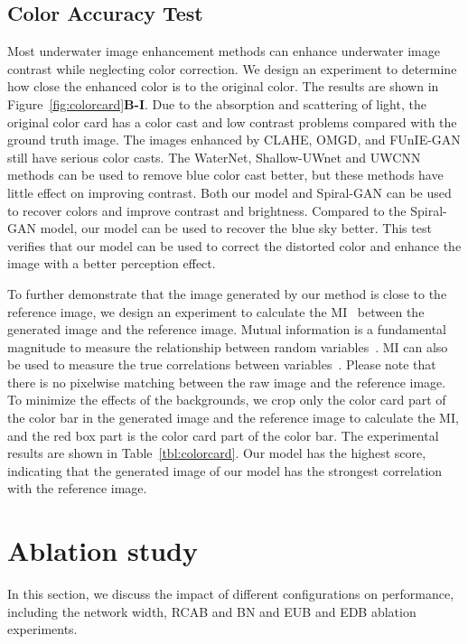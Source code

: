\documentclass[utf8]{FrontiersinHarvard} %
\begin{document}
\subsection{Color Accuracy Test}
Most underwater image enhancement methods can enhance underwater image contrast while neglecting color correction. We design an experiment to determine how close the enhanced color is to the original color. The results are shown in Figure~\ref{fig:colorcard}\textbf{B-I}. Due to the absorption and scattering of light, the original color card has a color cast and low contrast problems compared with the ground truth image. The images enhanced by CLAHE, OMGD, and FUnIE-GAN still have serious color casts. The WaterNet, Shallow-UWnet and UWCNN methods can be used to remove blue color cast better, but these methods have little effect on improving contrast. Both our model and Spiral-GAN can be used to recover colors and improve contrast and brightness. Compared to the Spiral-GAN model, our model can be used to recover the blue sky better. This test verifies that our model can be used to correct the distorted color and enhance the image with a better perception effect.

To further demonstrate that the image generated by our method is close to the reference image, we design an experiment to calculate the MI~\citep{kraskov2004estimating} between the generated image and the reference image. Mutual information is a fundamental magnitude to measure the relationship between random variables~\citep{2018Mutual}. MI can also be used to measure the true correlations between variables~\citep{Kinney2014Equitability}. Please note that there is no pixelwise matching between the raw image and the reference image. To minimize the effects of the backgrounds, we crop only the color card part of the color bar in the generated image and the reference image to calculate the MI, and the red box part is the color card part of the color bar. The experimental results are shown in Table~\ref{tbl:colorcard}. Our model has the highest score, indicating that the generated image of our model has the strongest correlation with the reference image.

\section{Ablation study}
In this section, we discuss the impact of different configurations on performance, including the network width, RCAB and BN and EUB and EDB ablation experiments.
\end{document}
